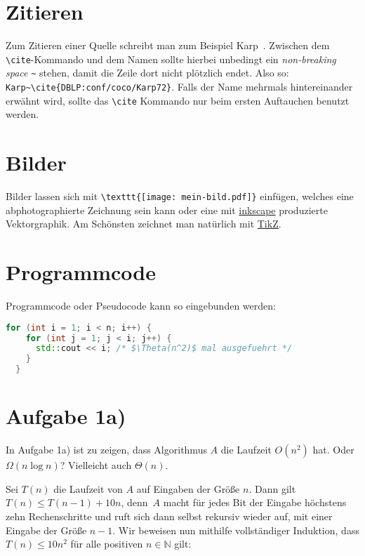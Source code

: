 \documentclass[a4paper,11pt,oneside]{scrartcl}
\begin{document}
\section*{Zitieren}

Zum Zitieren einer Quelle schreibt man zum Beispiel Karp~\cite{DBLP:conf/coco/Karp72}.
Zwischen dem \verb|\cite|-Kommando und dem Namen sollte hierbei unbedingt ein \textit{non-breaking space} \verb|~| stehen, damit die Zeile dort nicht plötzlich endet. Also so: \verb|Karp~\cite{DBLP:conf/coco/Karp72}|. Falls der Name mehrmals hintereinander erwähnt wird, sollte das \verb|\cite| Kommando nur beim ersten Auftauchen benutzt werden.


\section*{Bilder}

Bilder lassen sich mit \verb|\texttt{[image: mein-bild.pdf]}| einfügen, welches eine abphotographierte Zeichnung sein kann oder eine mit \href{https://inkscape.org/}{inkscape} produzierte Vektorgraphik. Am Schönsten zeichnet man natürlich mit \href{https://www.overleaf.com/learn/latex/TikZ_package/}{TikZ}.


\section*{Programmcode}

Programmcode oder Pseudocode kann so eingebunden werden:
\begin{lstlisting}[language=C++]
  for (int i = 1; i < n; i++) {
    for (int j = 1; j < i; j++) {
      std::cout << i; /* $\Theta(n^2)$ mal ausgefuehrt */
    }
  }
\end{lstlisting}


\section*{Aufgabe 1a)}

In Aufgabe 1a) ist zu zeigen, dass Algorithmus $A$ die Laufzeit $O(n^2)$ hat. Oder $\Omega(n\log n)$? Vielleicht auch $\Theta(n)$.

Sei $T(n)$ die Laufzeit von $A$ auf Eingaben der Größe $n$.
Dann gilt $T(n)\le T(n-1) + 10n$, denn~$A$ macht für jedes Bit der Eingabe höchstens zehn Rechenschritte und ruft sich dann selbst rekursiv wieder auf, mit einer Eingabe der Größe $n-1$. Wir beweisen nun mithilfe vollständiger Induktion, dass $T(n)\le 10n^2$ für alle positiven $n\in\mathbb{N}$ gilt:
\end{document}
